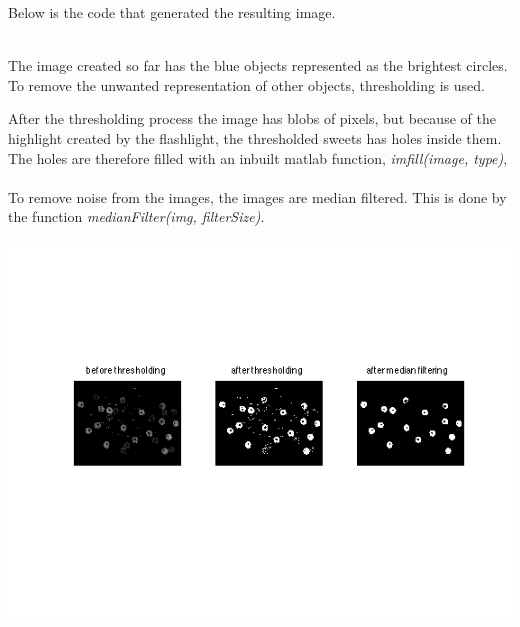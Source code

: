 \mbox{}
Below is the code that generated the resulting image. 

\mbox{}\\
The image created so far has the blue objects represented as the brightest circles. To remove the unwanted representation of other objects, thresholding is used.

After the thresholding process the image has blobs of pixels, but because of the highlight created by the flashlight, the thresholded sweets has holes inside them. The holes are therefore filled with an inbuilt matlab function, \emph{imfill(image, type)},
\\

\mbox{}\\
To remove noise from the images, the images are median filtered. This is done by the function \emph{medianFilter(img, filterSize)}. 
\\


\centerline{\includegraphics[clip=true, trim=40 100 40 80]{separate_step3_1.png}}

